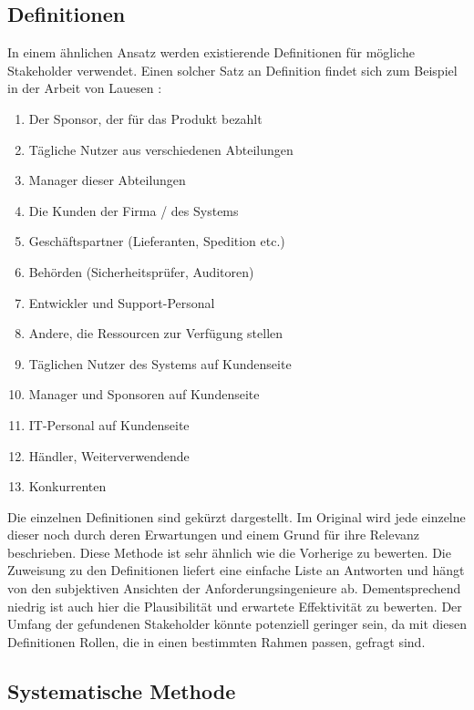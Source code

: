 \subsection{Definitionen}

In einem ähnlichen Ansatz werden existierende Definitionen für mögliche Stakeholder verwendet. Einen solcher Satz an Definition findet sich zum Beispiel in der Arbeit von Lauesen \cite{lauesen, kelanti}:

\begin{enumerate}
  \item Der Sponsor, der für das Produkt bezahlt
  \item Tägliche Nutzer aus verschiedenen Abteilungen
  \item Manager dieser Abteilungen
  \item Die Kunden der Firma / des Systems
  \item Geschäftspartner (Lieferanten, Spedition etc.)
  \item Behörden (Sicherheitsprüfer, Auditoren)
  \item Entwickler und Support-Personal
  \item Andere, die Ressourcen zur Verfügung stellen
  \item Täglichen Nutzer des Systems auf Kundenseite
  \item Manager und Sponsoren auf Kundenseite
  \item IT-Personal auf Kundenseite
  \item Händler, Weiterverwendende
  \item Konkurrenten
\end{enumerate}

Die einzelnen Definitionen sind gekürzt dargestellt. Im Original wird jede einzelne dieser noch durch deren Erwartungen und einem Grund für ihre Relevanz beschrieben. Diese Methode ist sehr ähnlich wie die Vorherige zu bewerten. Die Zuweisung zu den Definitionen liefert eine einfache Liste an Antworten und hängt von den subjektiven Ansichten der Anforderungsingenieure ab. Dementsprechend niedrig ist auch hier die Plausibilität und erwartete Effektivität zu bewerten. Der Umfang der gefundenen Stakeholder könnte potenziell geringer sein, da mit diesen Definitionen Rollen, die in einen bestimmten Rahmen passen, gefragt sind.

\subsection{Systematische Methode}

